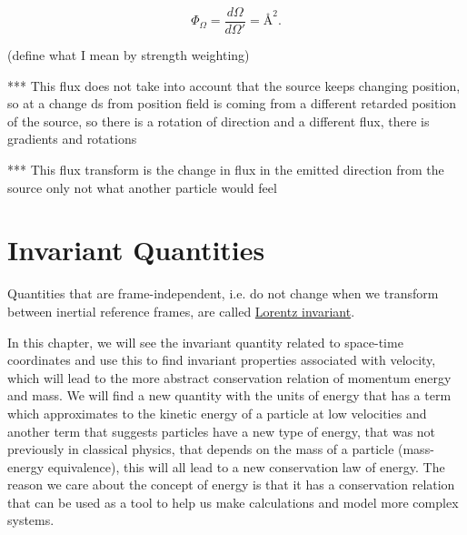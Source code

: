 \begin{equation}
	\label{eq: aberrational wavefront weighting}
	\Phi_\Omega = \frac{d\Omega}{d\Omega'} = \text{\AA}^2.
\end{equation}

(define what I mean by strength weighting)

*** This flux does not take into account that the source keeps changing position, so at a change ds from position field is coming from a different retarded position of the source, so there is a rotation of direction and a different flux, there is gradients and rotations

*** This flux transform is the change in flux in the emitted direction from the source only not what another particle would feel



\chapter{Invariant Quantities}

Quantities that are frame-independent, i.e.
do not change when we transform between inertial reference frames, are called \hyperlink{def-lorentz-invariant}{Lorentz invariant}.

In this chapter, we will see the invariant quantity related to space-time coordinates and use this to find invariant properties associated with velocity, which will lead to the more abstract conservation relation of momentum energy and mass.
We will find a new quantity with the units of energy that has a term which approximates to the kinetic energy of a particle at low velocities and another term that suggests particles have a new type of energy, that was not previously in classical physics, that depends on the mass of a particle (mass-energy equivalence), this will all lead to a new conservation law of energy.
 The reason we care about the concept of energy is that it has a conservation relation that can be used as a tool to help us make calculations and model more complex systems.

